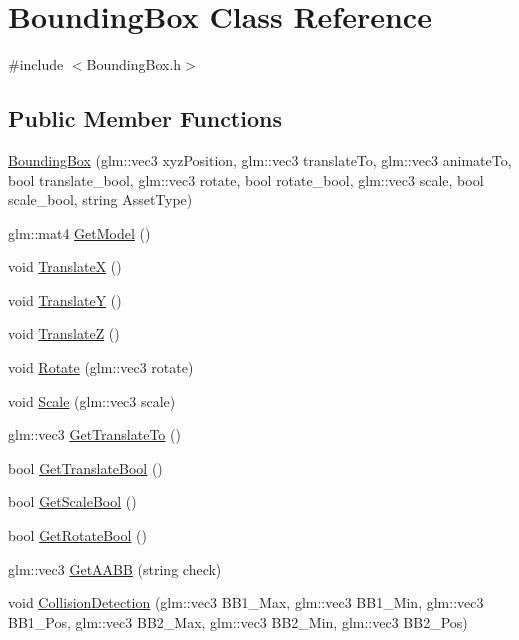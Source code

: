 \hypertarget{class_bounding_box}{}\section{Bounding\+Box Class Reference}
\label{class_bounding_box}


{\ttfamily \#include $<$Bounding\+Box.\+h$>$}

\subsection*{Public Member Functions}
\begin{DoxyCompactItemize}
\item 
\hyperlink{class_bounding_box_a4c5c018191c3a3dbba5633d62f249920}{Bounding\+Box} (glm\+::vec3 xyz\+Position, glm\+::vec3 translate\+To, glm\+::vec3 animate\+To, bool translate\+\_\+bool, glm\+::vec3 rotate, bool rotate\+\_\+bool, glm\+::vec3 scale, bool scale\+\_\+bool, string Asset\+Type)
\item 
glm\+::mat4 \hyperlink{class_bounding_box_a5fd1769f7157e7df40a6ab6a242fcfcc}{Get\+Model} ()
\item 
void \hyperlink{class_bounding_box_a9898275b1cd97761855156fc965412b1}{Translate\+X} ()
\item 
void \hyperlink{class_bounding_box_aedff87fb2721b1e706e6e033e35b676b}{Translate\+Y} ()
\item 
void \hyperlink{class_bounding_box_a33d133625c7a1a6f6dd7628f00388fd5}{Translate\+Z} ()
\item 
void \hyperlink{class_bounding_box_a728a3700574a5d9fbcac6d94561336ed}{Rotate} (glm\+::vec3 rotate)
\item 
void \hyperlink{class_bounding_box_ab84e48c88a509b20a469ccf5e23c4f11}{Scale} (glm\+::vec3 scale)
\item 
glm\+::vec3 \hyperlink{class_bounding_box_a45332d45575fe93b516267436abcd4fe}{Get\+Translate\+To} ()
\item 
bool \hyperlink{class_bounding_box_a501c1fd40b00ce6295fd60e1ed8cd92c}{Get\+Translate\+Bool} ()
\item 
bool \hyperlink{class_bounding_box_a262907e4b68e555edc57b21faef5685b}{Get\+Scale\+Bool} ()
\item 
bool \hyperlink{class_bounding_box_a6686a674cd3de57c987bccdfe6acbe92}{Get\+Rotate\+Bool} ()
\item 
glm\+::vec3 \hyperlink{class_bounding_box_a9d1fe341d5c2033e7f20ab9bdb4ae4b9}{Get\+A\+A\+B\+B} (string check)
\item 
void \hyperlink{class_bounding_box_a158978699951663552a2936f2a8a2339}{Collision\+Detection} (glm\+::vec3 B\+B1\+\_\+\+Max, glm\+::vec3 B\+B1\+\_\+\+Min, glm\+::vec3 B\+B1\+\_\+\+Pos, glm\+::vec3 B\+B2\+\_\+\+Max, glm\+::vec3 B\+B2\+\_\+\+Min, glm\+::vec3 B\+B2\+\_\+\+Pos)
\end{DoxyCompactItemize}


